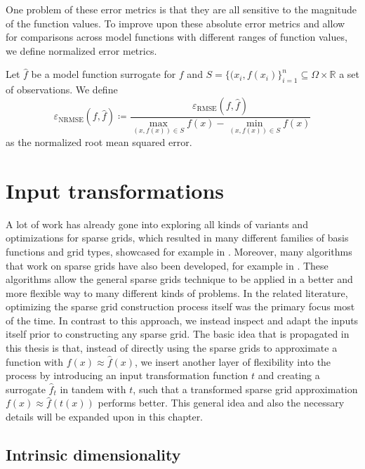 \documentclass[
  a4paper,  %
  twoside,  %
  bibliography=totoc,
  headsepline,
  cleardoublepage=empty,
  parskip=half,
  draft=false
]{scrbook}
\begin{document}
One problem of these error metrics is that they are all sensitive to the magnitude of the function values.
To improve upon these absolute error metrics and allow for comparisons across model functions with different ranges of function values, we define normalized error metrics.

\begin{definition}
Let $\hat{f}$ be a model function surrogate for $f$ and $S=\{(x_i, f(x_i)\}_{i=1}^n \subseteq \Omega \times \mathds{R}$ a set of observations.
We define
\begin{equation}
\varepsilon_{\mathrm{NRMSE}}(f, \hat{f}) \coloneqq \frac{\varepsilon_{\mathrm{RMSE}}(f, \hat{f})}{\max\limits_{(x, f(x)) \in S} f(x) - \min\limits_{(x, f(x)) \in S} f(x)}
\end{equation}
as the normalized root mean squared error.
\end{definition}


\chapter{Input transformations}
\label{chap:c3}

A lot of work has already gone into exploring all kinds of variants and optimizations for sparse grids, which resulted in many different families of basis functions and grid types, showcased for example in \cite{Valentin2019, Feuersaenger2010}.
Moreover, many algorithms that work on sparse grids have also been developed, for example in \cite{Gerstner1998, Garcke2001, Pflueger2010, Valentin2019, Rehme2021}.
These algorithms allow the general sparse grids technique to be applied in a better and more flexible way to many different kinds of problems.
In the related literature, optimizing the sparse grid construction process itself was the primary focus most of the time.
In contrast to this approach, we instead inspect and adapt the inputs itself prior to constructing any sparse grid.
The basic idea that is propagated in this thesis is that, instead of directly using the sparse grids to approximate a function with $f(x) \approx \hat{f}(x)$, we insert another layer of flexibility into the process by introducing an input transformation function $t$ and creating a surrogate $\hat{f}_t$ in tandem with $t$, such that a transformed sparse grid approximation $f(x) \approx \hat{f}(t(x))$ performs better.
This general idea and also the necessary details will be expanded upon in this chapter.

\section{Intrinsic dimensionality}
\label{sec:intrinsic}
\end{document}
